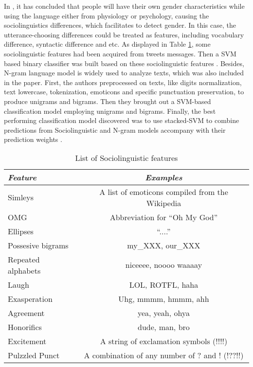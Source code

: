 \documentclass[runningheads]{llncs}
\begin{document}
	In \cite{jinyu2014study}, it has concluded that people will have their own gender characteristics while using the language either from physiology or psychology, causing the sociolinguistics differences, which facilitates to detect gender. In this case, the utterance-choosing differences could be treated as features, including vocabulary difference, syntactic difference and etc. As displayed in Table \ref{table:linguistic-feature}, some sociolinguistic features had been acquired from tweets messages. Then a SVM \cite{suykens1999least}based binary classifier was built based on these sociolinguistic features \cite{rao2010classifying}. Besides, N-gram language model is widely used to analyze texts, which was also included in the paper. First, the authors preprocessed on texts, like digits normalization, text lowercase, tokenization, emoticons and specific punctuation preservation, to produce unigrams and bigrams. Then they brought out a SVM-based classification model employing unigrams and bigrams. Finally, the best performing classification model discovered was to use stacked-SVM to combine predictions from Sociolinguistic and N-gram models accompany with their prediction weights  \cite{rao2010classifying}.
	
		\begin{table}
		\caption{List of Sociolinguistic features  \cite{rao2010classifying}}
		\begin{tabular}{| l | c |}
			\hline
			\textit{Feature} & \textit{Examples} \\
			\hline
			Simleys & A list of emoticons compiled from the Wikipedia\\
			OMG & Abbreviation for \enquote{Oh My God}  \\
			Ellipses &  \enquote{....}\\
			Possesive bigrams & my\_XXX, our\_XXX \\
			Repeated alphabets & niceeee, noooo waaaay \\
			Laugh & LOL, ROTFL, haha \\
			Exasperation & Uhg, mmmm, hmmm, ahh \\
			Agreement & yea, yeah, ohya \\
			Honorifics &  dude, man, bro\\
			Excitement &  A string of exclamation symbols (!!!!)\\
			Pulzzled Punct &  A combination of any number of ? and ! (!??!!)\\
			\hline
		\end{tabular}
		\label{table:linguistic-feature}
	\end{table}
	
\end{document}
